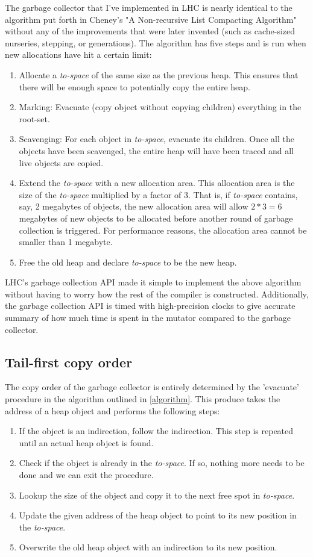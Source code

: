 \documentclass[a4paper,oneside]{memoir}
\begin{document}
The garbage collector that I've implemented in LHC is nearly identical to the
algorithm put forth in Cheney's "A Non-recursive List Compacting Algorithm"
without any of the improvements that were later invented (such as cache-sized
nurseries, stepping, or generations). The algorithm has five steps and is run
when new allocations have hit a certain limit:
\begin{enumerate}
  \item Allocate a \emph{to-space} of the same size as the previous heap. This
  ensures that there will be enough space to potentially copy the entire heap.
  \item Marking: Evacuate (copy object without copying children) everything in the root-set.
  \item Scavenging: For each object in \emph{to-space}, evacuate its children. Once all
  the objects have been scavenged, the entire heap will have been traced and all
  live objects are copied.
  \item Extend the \emph{to-space} with a new allocation area. This allocation
  area is the size of the \emph{to-space} multiplied by a factor of 3. That is,
  if \emph{to-space} contains, say, 2 megabytes of objects, the new allocation
  area will allow $2*3=6$ megabytes of new objects to be allocated before another
  round of garbage collection is triggered. For performance reasons, the allocation
  area cannot be smaller than 1 megabyte.
  \item Free the old heap and declare \emph{to-space} to be the new heap.
\end{enumerate}

LHC's garbage collection API made it simple to implement the above algorithm
without having to worry how the rest of the compiler is constructed.
Additionally, the garbage collection API is timed with high-precision clocks
to give accurate summary of how much time is spent in the mutator compared to
the garbage collector.

\subsection{Tail-first copy order}

The copy order of the garbage collector is entirely determined by the 'evacuate'
procedure in the algorithm outlined in \ref{algorithm}. This produce takes the
address of a heap object and performs the following steps:
\begin{enumerate}
  \item If the object is an indirection, follow the indirection. This step is
  repeated until an actual heap object is found.
  \item Check if the object is already in the \emph{to-space}. If so, nothing
  more needs to be done and we can exit the procedure.
  \item Lookup the size of the object and copy it to the next free spot in
  \emph{to-space}.
  \item Update the given address of the heap object to point to its new position
  in the \emph{to-space}.
  \item Overwrite the old heap object with an indirection to its new position.
\end{enumerate}
\end{document}
